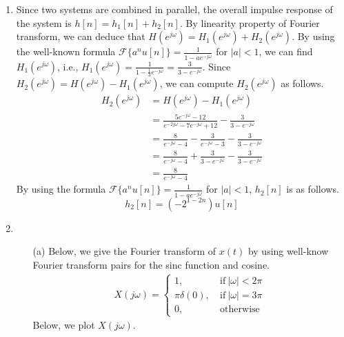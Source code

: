 \documentclass[10pt,a4paper, margin=1in]{article}
\begin{document}
\begin{enumerate}
\begin{itemize}
	\end{itemize}
	
	\item
		Since two systems are combined in parallel, the overall impulse response of the system is $h[n] = h_1[n] + h_2[n]$. By linearity property of Fourier transform, we can deduce that $H(e^{j\omega}) = H_1(e^{j\omega}) + H_2(e^{j\omega})$. By using the well-known formula $\mathcal{F}\{a^nu[n]\} = \frac{1}{1-ae^{-j\omega}}$ for $|a| < 1$, we can find $H_1(e^{j\omega})$, i.e., $H_1(e^{j\omega}) = \frac{1}{1 - \frac{1}{3}e^{-j\omega}} = \frac{3}{3 - e^{-j\omega}}$. Since $H_2(e^{j\omega}) = H(e^{j\omega}) - H_1(e^{j\omega})$, we can compute $H_2(e^{j\omega})$ as follows.
			\begin{equation}
			\begin{split}
				H_2(e^{j\omega}) & = H(e^{j\omega}) - H_1(e^{j\omega})\\
				& = \frac{5e^{-j\omega} - 12}{e^{-2j\omega} - 7e^{-j\omega} + 12} - \frac{3}{3 - e^{-j\omega}}\\
				& = \frac{8}{e^{-j\omega} - 4} - \frac{3}{e^{-j\omega} - 3} - \frac{3}{3 - e^{-j\omega}}\\
				& = \frac{8}{e^{-j\omega} - 4} + \frac{3}{3 - e^{-j\omega}} - \frac{3}{3 - e^{-j\omega}}\\
				& = \frac{8}{e^{-j\omega} - 4}
			\end{split}
			\end{equation}
		By using the formula $\mathcal{F}\{a^nu[n]\} = \frac{1}{1-ae^{-j\omega}}$ for $|a| < 1$, $h_2[n]$ is as follows.
			\begin{equation}
				h_2[n] = (-2^{1 - 2n})u[n]
			\end{equation}
		
		
	\item
	\begin{itemize}
	\item[(a)]
		Below, we give the Fourier transform of $x(t)$ by using well-know Fourier transform pairs for the sinc function and cosine.
		\begin{equation}
		\begin{split}
			X(j\omega) = \begin{cases}
			1, \ & \text{if} \ |\omega| < 2\pi\\
			\pi\delta(0), \ & \text{if} \ |\omega| = 3\pi\\
			0, \ & \text{otherwise}
						\end{cases}
		\end{split}
		\end{equation}
		Below, we plot $X(j\omega)$.
	

\end{itemize}
\end{enumerate}
\end{document}
